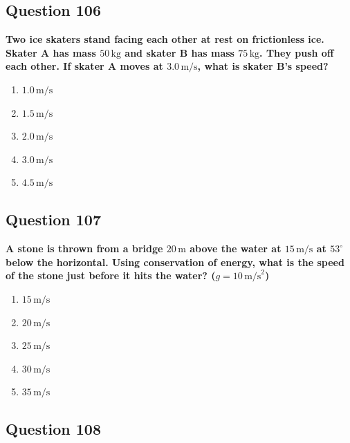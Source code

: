 \documentclass[12pt,letterpaper]{article}
\begin{document}
\subsection{Question 106}

\begin{questionbox}
\textbf{Two ice skaters stand facing each other at rest on frictionless ice. Skater A has mass $50\,\text{kg}$ and skater B has mass $75\,\text{kg}$. They push off each other. If skater A moves at $3.0\,\text{m/s}$, what is skater B's speed?}

\begin{enumerate}[label=\alph*)]
    \item $1.0\,\text{m/s}$
    \item $1.5\,\text{m/s}$
    \item $2.0\,\text{m/s}$
    \item $3.0\,\text{m/s}$
    \item $4.5\,\text{m/s}$
\end{enumerate}
\end{questionbox}

\subsection{Question 107}

\begin{questionbox}
\textbf{A stone is thrown from a bridge $20\,\text{m}$ above the water at $15\,\text{m/s}$ at $53^\circ$ below the horizontal. Using conservation of energy, what is the speed of the stone just before it hits the water? ($g = 10\,\text{m/s}^2$)}

\begin{enumerate}[label=\alph*)]
    \item $15\,\text{m/s}$
    \item $20\,\text{m/s}$
    \item $25\,\text{m/s}$
    \item $30\,\text{m/s}$
    \item $35\,\text{m/s}$
\end{enumerate}
\end{questionbox}

\subsection{Question 108}
\end{document}
